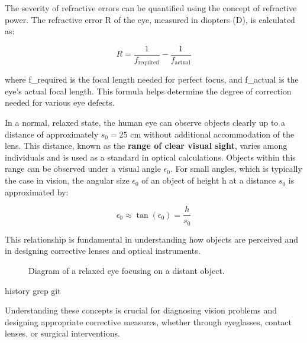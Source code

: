 \documentclass[
  a4paper,
]{book}
\begin{document}
The severity of refractive errors can be quantified using the concept of
refractive power. The refractive error R of the eye, measured in
diopters (D), is calculated as:

\[R = \frac{1}{f_{\text{required}}} - \frac{1}{f_{\text{actual}}}\]

where f\_required is the focal length needed for perfect focus, and
f\_actual is the eye's actual focal length. This formula helps determine
the degree of correction needed for various eye defects.

In a normal, relaxed state, the human eye can observe objects clearly up
to a distance of approximately \(s_0=25\) cm without additional
accommodation of the lens. This distance, known as the \textbf{range of
clear visual sight}, varies among individuals and is used as a standard
in optical calculations. Objects within this range can be observed under
a visual angle \(\epsilon_0\). For small angles, which is typically the
case in vision, the angular size \(\epsilon_0\) of an object of height h
at a distance \(s_0\) is approximated by:

\[
\epsilon_0 \approx \tan(\epsilon_0) = \frac{h}{s_0}
\]

This relationship is fundamental in understanding how objects are
perceived and in designing corrective lenses and optical instruments.

\begin{figure}


\caption{\label{fig-relaxed-eye}Diagram of a relaxed eye focusing on a
distant object.}

\end{figure}%

history \textbar grep git

Understanding these concepts is crucial for diagnosing vision problems
and designing appropriate corrective measures, whether through
eyeglasses, contact lenses, or surgical interventions.
\end{document}
